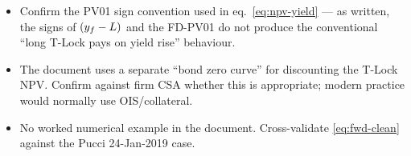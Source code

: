\documentclass[11pt,a4paper]{article}
\begin{document}
\begin{todobox}
\begin{itemize}[noitemsep]
  \item Confirm the PV01 sign convention used in eq.~\ref{eq:npv-yield}
        --- as written, the signs of $(y_f - L)$ and the FD-PV01
        do not produce the conventional ``long T-Lock pays on yield
        rise'' behaviour.
  \item The document uses a separate ``bond zero curve'' for
        discounting the T-Lock NPV. Confirm against firm CSA whether
        this is appropriate; modern practice would normally use
        OIS/collateral.
  \item No worked numerical example in the document. Cross-validate
        \eqref{eq:fwd-clean} against the Pucci 24-Jan-2019 case.
\end{itemize}
\end{todobox}
\end{document}
